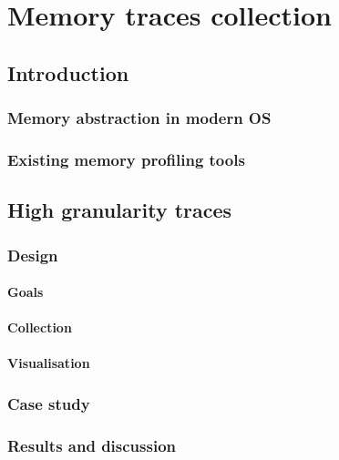 \chapter{Memory traces collection}

\section{Introduction}

\subsection{Memory abstraction in modern OS}


\subsection{Existing memory profiling tools}


\section{High granularity traces}


\subsection{Design}

\subsubsection{Goals}

\subsubsection{Collection}

\subsubsection{Visualisation}

\subsection{Case study}

\subsection{Results and discussion}


